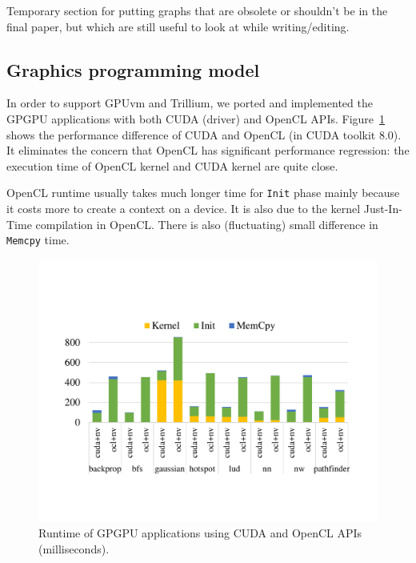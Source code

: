 \appendix

Temporary section for putting graphs that are obsolete or shouldn't be in the final paper,
but which are still useful to look at while writing/editing.

\subsection{Graphics programming model}
In order to support GPUvm and Trillium, we ported and implemented the GPGPU applications
with both CUDA (driver) and OpenCL APIs. Figure~\ref{fig_graphics_api} shows the performance
difference of CUDA and OpenCL (in CUDA toolkit 8.0). It eliminates the concern that OpenCL
has significant performance regression: the execution time of OpenCL kernel and
CUDA kernel are quite close.

OpenCL runtime usually takes much longer time for \texttt{Init} phase mainly because it costs more
to create a context on a device. It is also due to the kernel Just-In-Time compilation in OpenCL.
There is also (fluctuating) small difference in \texttt{Memcpy} time.

\begin{figure}[!th]
	\centering
	\includegraphics[width=\linewidth,trim={2.2cm 3.8cm 2cm 4cm},clip]{data/basic/graphics_api.pdf}
	\caption{{\footnotesize Runtime of GPGPU applications using CUDA and OpenCL APIs (milliseconds).}}
	\label{fig_graphics_api} \end{figure}

